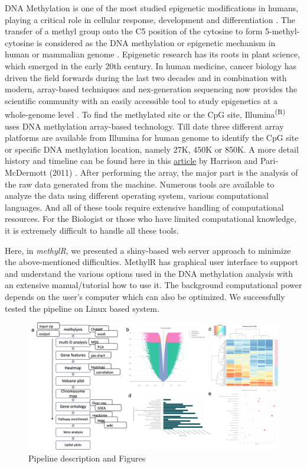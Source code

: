\documentclass[
  a4paper,
  oneside,
  open=any]{scrreport}
\begin{document}
DNA Methylation is one of the most studied epigenetic modifications in
humans, playing a critical role in cellular response, development and
differentiation \autocite{Das2019}. The transfer of a methyl group onto
the C5 position of the cytosine to form 5-methyl-cytosine is considered
as the DNA methylation or epigenetic mechanism in human or mammalian
genome \autocite{moore2013dna}. Epigenetic research has its roots in
plant science, which emerged in the early 20th century. In human
medicine, cancer biology has driven the field forwards during the last
two decades and in combination with modern, array-based techniques and
nex-generation sequencing now provides the scientific community with an
easily accessible tool to study epigenetics at a whole-genome level
\autocite{das2021dna}. To find the methylated site or the CpG site,
Illumina\textsuperscript{(R)} uses DNA methylation array-based
technology. Till date three different array platforms are available from
Illumina for human genome to identify the CpG site or specific DNA
methylation location, namely 27K, 450K or 850K. A more detail history
and timeline can be found here in this
\href{https://www.frontiersin.org/articles/10.3389/fgene.2011.00074/full}{article}
by Harrison and Pari-McDermott (2011) \autocite{harrison2011dna}. After
performing the array, the major part is the analysis of the raw data
generated from the machine. Numerous tools are available to analyze the
data using different operating system, various computational languages.
And all of these tools require extensive handling of computational
resources. For the Biologist or those who have limited computational
knowledge, it is extremely difficult to handle all these tools.

Here, in \emph{methylR}, we presented a shiny-based web server approach
to minimize the above-mentioned difficulties. MethylR has graphical user
interface to support and understand the various options used in the DNA
methylation analysis with an extensive manual/tutorial how to use it.
The background computational power depends on the user's computer which
can also be optimized. We successfully tested the pipeline on Linux
based system.\\

\begin{figure}[H]

{\centering \includegraphics{./_images/Figure1.png}

}

\caption{Pipeline description and Figures}

\end{figure}
\end{document}
